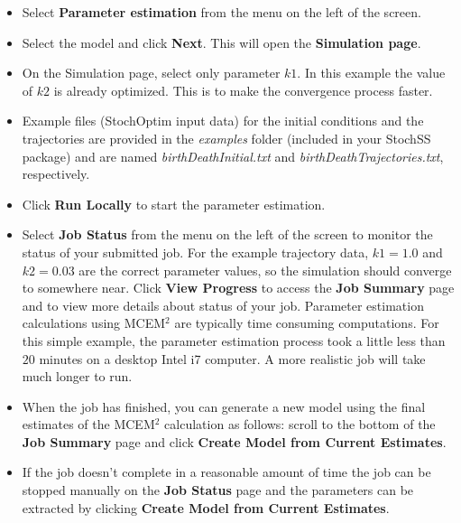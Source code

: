 \begin{itemize}
\item Select \textbf{Parameter estimation} from the menu on the left of the screen.
\item Select the model and click \textbf{Next}. This will open the \textbf{Simulation page}.
\item On the Simulation page, select only parameter $k1$. In this example the value of $k2$ is already optimized. This is to make the convergence process faster.
\item Example files (StochOptim input data) for the initial conditions and the trajectories are provided in the \textit{examples} folder (included in your StochSS package) and are named \textit{birthDeathInitial.txt} and \textit{birthDeathTrajectories.txt}, respectively.
\item Click \textbf{Run Locally} to start the parameter estimation.
\item Select \textbf{Job Status} from the menu on the left of the screen to monitor the status of your submitted job. For the example trajectory data, $k1 = 1.0$ and $k2 = 0.03$ are the correct parameter values, so the simulation should converge to somewhere near.
Click \textbf{View Progress} to access the \textbf{Job Summary} page and to view more details about status of your job. Parameter estimation calculations using MCEM$^2$ are typically time consuming computations. For this simple example, the parameter estimation process took a little less than $20$ minutes on a desktop Intel i7 computer. A more realistic job will take much longer to run.

\item When the job has finished, you can generate a new model using the final estimates of the MCEM$^2$ calculation as follows: scroll to the bottom of the \textbf{Job Summary} page and click \textbf{Create Model from Current Estimates}. 
\item If the job doesn't complete in a reasonable amount of time the job can be stopped manually on the \textbf{Job Status} page and the parameters can be extracted by clicking \textbf{Create Model from Current Estimates}.
\end{itemize}

